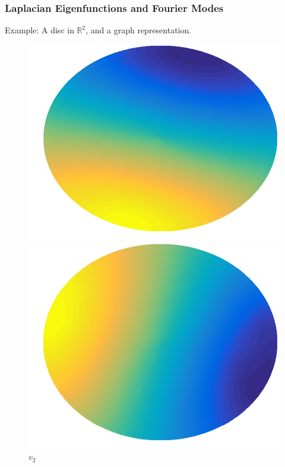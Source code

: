 \documentclass{beamer}
\begin{document}
\begin{frame}
  \frametitle{Laplacian Eigenfunctions and Fourier Modes}
  Example: A disc in $\mathbb{R}^2$, and a graph representation.
  \setlength{\abovecaptionskip}{0pt plus 0pt minus 2pt} %
  \setlength{\belowcaptionskip}{0pt plus 0pt minus 2pt} %
  \begin{figure}
    \begin{minipage}[b]{0.18\linewidth}
      \centering
      \includegraphics[width=\textwidth]{./Images/DiscExample/ManifoldLaplacian/evec02.png}
      \caption{\tiny $v_2$}
    \end{minipage}
    \hfill
    \begin{minipage}[b]{0.18\linewidth}
      \centering
      \includegraphics[width=\textwidth]{./Images/DiscExample/ManifoldLaplacian/evec03.png}

\end{minipage}
\end{figure}
\end{frame}
\end{document}
